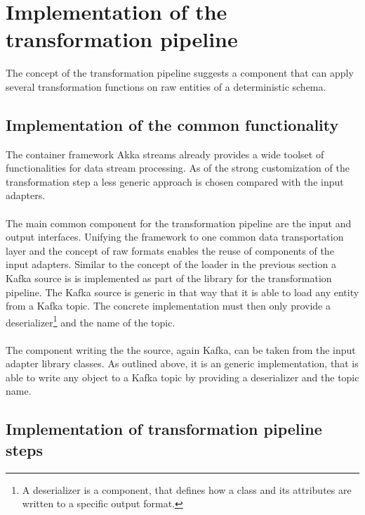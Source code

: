 \section{Implementation of the transformation pipeline}

The concept of the transformation pipeline suggests a component that can apply several transformation functions on raw entities of a deterministic schema.

\subsection{Implementation of the common functionality}

The container framework Akka streams already provides a wide toolset of functionalities for data stream processing. As of the strong customization of the transformation step a less generic approach is chosen compared with the input adapters. 
\\\\
The main common component for the transformation pipeline are the input and output interfaces. Unifying the framework to one common data transportation layer and the concept of raw formats enables the reuse of components of the input adapters. Similar to the concept of the loader in the previous section a Kafka source is is implemented as part of the library for the transformation pipeline. The Kafka source is generic in that way that it is able to load any entity from a Kafka topic. The concrete implementation must then only provide a deserializer\footnote{A deserializer is a component, that defines how a class and its attributes are written to a specific output format.} and the name of the topic.
\\\\
The component writing the the source, again Kafka, can be taken from the input adapter library classes. As outlined above, it is an generic implementation, that is able to write any object to a Kafka topic by providing a deserializer and the topic name.

\subsection{Implementation of transformation pipeline steps}

